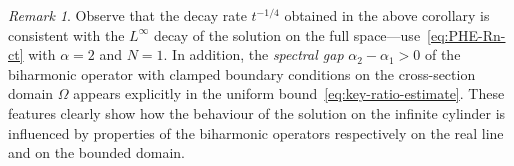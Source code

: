 \documentclass[a4paper, reqno,titlepage]{amsart}
\numberwithin{equation}{section}
\theoremstyle{plain}
\theoremstyle{definition}
\theoremstyle{remark}
\newtheorem{remark}[theorem]{Remark}
\begin{document}
\begin{remark}
  Observe that the decay rate $t^{-1/4}$ obtained in the above corollary is consistent with the $L^\infty$ decay of the solution on the full space---use~\eqref{eq:PHE-Rn-ct} with $\alpha = 2$ and $N=1$. In addition, the \emph{spectral gap} $\alpha_2 - \alpha_1 > 0$ of the biharmonic operator with clamped boundary conditions on the cross-section domain $\Omega$ appears explicitly in the uniform bound~\eqref{eq:key-ratio-estimate}. These features clearly show how the behaviour of the solution on the infinite cylinder is influenced by properties of the biharmonic operators respectively on the real line and on the bounded domain.
\end{remark}

%
%
%
\providecommand{\bysame}{\leavevmode\hbox to3em{\hrulefill}\thinspace}
\end{document}
